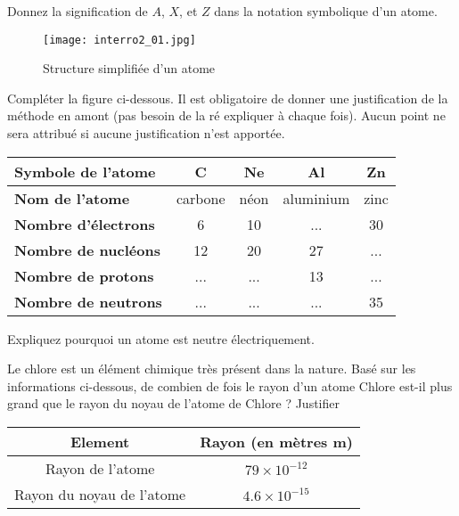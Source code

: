 \documentclass{exam}
\begin{document}
\begin{questions}
  \question[0.5] Donnez la signification de $A$, $X$, et $Z$ dans la notation symbolique d'un atome.

\begin{figure}[H]
    \centering
    \texttt{[image: interro2\_01.jpg]}
    \caption{Structure simplifiée d'un atome}
\end{figure} 

  \question[1] Compléter la figure ci-dessous. Il est obligatoire de donner une justification de la méthode en amont (pas besoin de la ré expliquer à chaque fois). Aucun point ne sera attribué si aucune justification n'est apportée.

\begin{table}[H]
  \centering
  \begingroup
  \renewcommand{\arraystretch}{1.5}
  \begin{tabularx}{\textwidth}{|X|C|C|C|C|}
    \hline
    \textbf{Symbole de l’atome} & \textbf{C} & \textbf{Ne} & \textbf{Al} & \textbf{Zn} \\
    \hline
    \textbf{Nom de l’atome} & carbone & néon & aluminium & zinc \\
    \hline
    \textbf{Nombre d’électrons} & 6 & 10 & ... & 30 \\
    \hline
    \textbf{Nombre de nucléons} & 12 & 20 & 27 & ... \\
    \hline
    \textbf{Nombre de protons} & ... & ... & 13 & ... \\
    \hline
    \textbf{Nombre de neutrons} & ... & ... & ... & 35 \\
    \hline
  \end{tabularx}
  \endgroup
\end{table}

\question[0.5] Expliquez pourquoi un atome est neutre électriquement.

\question[1.5] Le chlore est un élément chimique très présent dans la nature. Basé sur les informations ci-dessous, de combien de fois le rayon d'un atome Chlore est-il plus grand que le rayon du noyau de l'atome de Chlore ? Justifier

\begin{center}
\begin{tabular}{SS}
  \toprule
  {Element} & {Rayon (en mètres \si{m})} \\
  \midrule
  {Rayon de l'atome} & {\(79 \times 10^{-12}\)} \\
  {Rayon du noyau de l'atome} & {\(4.6 \times 10^{-15}\)} \\
  \bottomrule
\end{tabular}
\end{center}


\end{questions}
\end{document}
